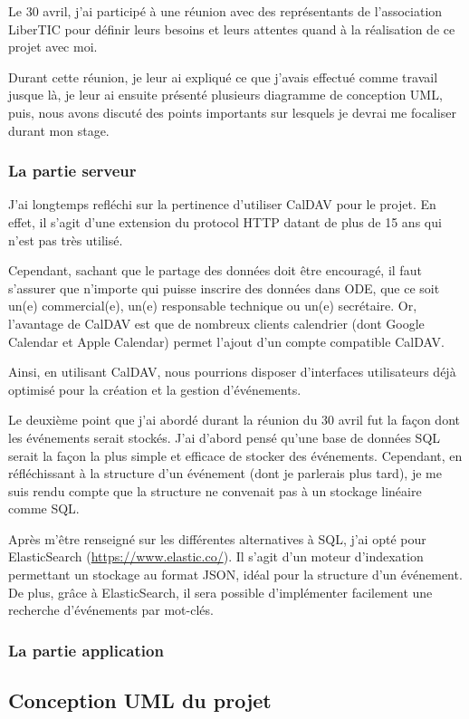 Le 30 avril, j'ai participé à une réunion avec des représentants de l'association LiberTIC pour définir leurs besoins et leurs attentes quand à la réalisation de ce projet avec moi.

Durant cette réunion, je leur ai expliqué ce que j'avais effectué comme travail jusque là, je leur ai ensuite présenté plusieurs diagramme de conception UML, puis, nous avons discuté des points importants sur lesquels je devrai me focaliser durant mon stage.

\subsubsection{La partie serveur}

J'ai longtemps refléchi sur la pertinence d'utiliser CalDAV pour le projet. En effet, il s'agit d'une extension du protocol HTTP datant de plus de 15 ans qui n'est pas très utilisé.

Cependant, sachant que le partage des données doit être encouragé, il faut s'assurer que n'importe qui puisse inscrire des données dans ODE, que ce soit un(e) commercial(e), un(e) responsable technique ou un(e) secrétaire. Or, l'avantage de CalDAV est que de nombreux clients calendrier (dont Google Calendar et Apple Calendar) permet l'ajout d'un compte compatible CalDAV.

Ainsi, en utilisant CalDAV, nous pourrions disposer d'interfaces utilisateurs déjà optimisé pour la création et la gestion d'événements.

Le deuxième point que j'ai abordé durant la réunion du 30 avril fut la façon dont les événements serait stockés. J'ai d'abord pensé qu'une base de données SQL serait la façon la plus simple et efficace de stocker des événements. Cependant, en réfléchissant à la structure d'un événement (dont je parlerais plus tard), je me suis rendu compte que la structure ne convenait pas à un stockage linéaire comme SQL.

Après m'être renseigné sur les différentes alternatives à SQL, j'ai opté pour ElasticSearch (\url{https://www.elastic.co/}). Il s'agit d'un moteur d'indexation permettant un stockage au format JSON, idéal pour la structure d'un événement. De plus, grâce à ElasticSearch, il sera possible d'implémenter facilement une recherche d'événements par mot-clés.

\subsubsection{La partie application}

\subsection{Conception UML du projet}